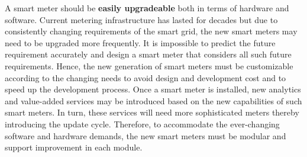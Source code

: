 A smart meter should be \textbf{easily upgradeable} both in terms of hardware and software. Current metering infrastructure has lasted for decades but due to consistently changing requirements of the smart grid, the new smart meters may need to be upgraded more frequently. It is impossible to predict the future requirement accurately and design a smart meter that considers all such future requirements. Hence, the new generation of smart meters must be customizable according to the changing needs to avoid design and development cost and to speed up the development process. Once a smart meter is installed, new analytics and value-added services may be introduced based on the new capabilities of such smart meters. In turn, these services will need more sophisticated meters thereby introducing the update cycle. Therefore, to accommodate the ever-changing software and hardware demands, the new smart meters must be modular and support improvement in each module.

